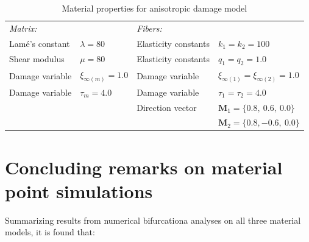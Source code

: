 \documentclass[12pt]{article}
\newcommand{\tensor}[1]{\ensuremath{\boldsymbol{#1}}}
\numberwithin{equation}{section}
\begin{document}
\begin{table}[H]
  \begin{center}
    \begin{tabular}{ l l l l }
      \toprule
      \it{Matrix}:
      &
      
      &
     
      \it{Fibers}:
      
      &
      \\
      Lam\'{e}'s constant
      &
      $\lambda=80$
      &
      Elasticity constants
      &
      $k_1 = k_2 = 100$
      \\
      Shear modulus
      &
      $\mu = 80$
      &
      Elasticity constants
      &
      $q_1 = q_2 = 1.0$      
      \\
      Damage variable  
      &
      $\xi_{\infty(m)} = 1.0$
      &
      Damage variable
      &
      $\xi_{\infty(1)} = \xi_{\infty(2)} = 1.0$      
      \\
      Damage variable   
      &
      $\tau_m = 4.0$
      &
      Damage variable
      &
      $\tau_1 = \tau_2 = 4.0$
      \\
      &
      
      &
      Direction vector
      &
      $\tensor M_1 = \{ 0.8,~0.6,~0.0\}$
      \\
      &

      &
	       
      &
      $\tensor M_2 = \{ 0.8,-0.6,~0.0\}$
      \\
      \bottomrule
    \end{tabular}
    \caption{Material properties for anisotropic damage model}
    \label{tab:aniso_material}
  \end{center}
\end{table}



\section{Concluding remarks on material point simulations}
Summarizing results from numerical bifurcationa analyses on all three
material models, it is found that:
\end{document}

